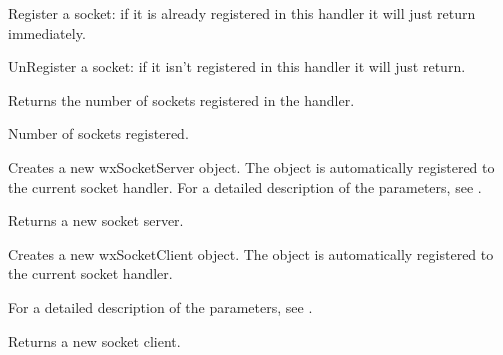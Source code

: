 
Register a socket: if it is already registered in this handler it will just
return immediately.



%
%


UnRegister a socket: if it isn't registered in this handler it will just
return.



%
%


Returns the number of sockets registered in the handler.


Number of sockets registered.

%
%


Creates a new wxSocketServer object. The object is automatically registered
to the current socket handler.
For a detailed description of the parameters, see .


Returns a new socket server.

%
%


Creates a new wxSocketClient object. The object is automatically registered
to the current socket handler.

For a detailed description of the parameters, see .


Returns a new socket client.

